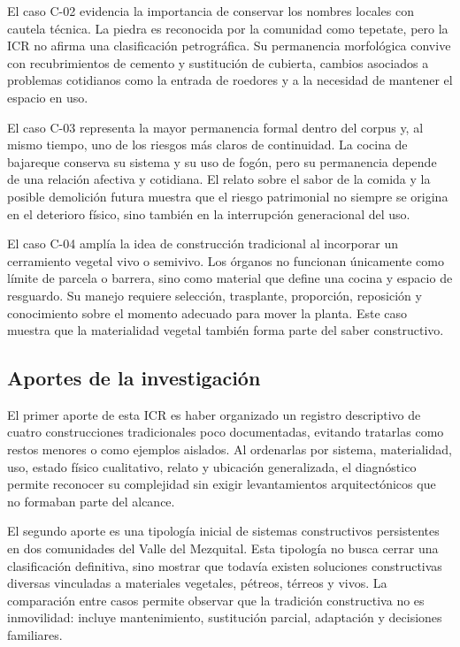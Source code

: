 El caso C-02 evidencia la importancia de conservar los nombres locales con cautela técnica. La piedra es reconocida por la comunidad como tepetate, pero la ICR no afirma una clasificación petrográfica. Su permanencia morfológica convive con recubrimientos de cemento y sustitución de cubierta, cambios asociados a problemas cotidianos como la entrada de roedores y a la necesidad de mantener el espacio en uso.

El caso C-03 representa la mayor permanencia formal dentro del corpus y, al mismo tiempo, uno de los riesgos más claros de continuidad. La cocina de bajareque conserva su sistema y su uso de fogón, pero su permanencia depende de una relación afectiva y cotidiana. El relato sobre el sabor de la comida y la posible demolición futura muestra que el riesgo patrimonial no siempre se origina en el deterioro físico, sino también en la interrupción generacional del uso.

El caso C-04 amplía la idea de construcción tradicional al incorporar un cerramiento vegetal vivo o semivivo. Los órganos no funcionan únicamente como límite de parcela o barrera, sino como material que define una cocina y espacio de resguardo. Su manejo requiere selección, trasplante, proporción, reposición y conocimiento sobre el momento adecuado para mover la planta. Este caso muestra que la materialidad vegetal también forma parte del saber constructivo.

\subsection{Aportes de la investigación}

El primer aporte de esta ICR es haber organizado un registro descriptivo de cuatro construcciones tradicionales poco documentadas, evitando tratarlas como restos menores o como ejemplos aislados. Al ordenarlas por sistema, materialidad, uso, estado físico cualitativo, relato y ubicación generalizada, el diagnóstico permite reconocer su complejidad sin exigir levantamientos arquitectónicos que no formaban parte del alcance.

El segundo aporte es una tipología inicial de sistemas constructivos persistentes en dos comunidades del Valle del Mezquital. Esta tipología no busca cerrar una clasificación definitiva, sino mostrar que todavía existen soluciones constructivas diversas vinculadas a materiales vegetales, pétreos, térreos y vivos. La comparación entre casos permite observar que la tradición constructiva no es inmovilidad: incluye mantenimiento, sustitución parcial, adaptación y decisiones familiares.

